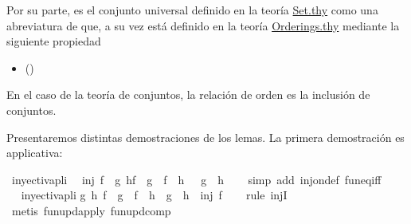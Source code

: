 \begin{isabellebody}
\begin{isamarkuptext}
\begin{itemize}
  \end{itemize} 
  Por su parte,  es el conjunto universal definido en la 
  teoría \href{http://bit.ly/2XtHCW6}{Set.thy} como una abreviatura de 
   que, a su vez está definido en la teoría 
  \href{http://bit.ly/2Xyj9Pe}{Orderings.thy} mediante la siguiente
  propiedad 
  \begin{itemize}
    \item[]  
      \hfill ()
  \end{itemize} 
  En el caso de la teoría de conjuntos, la relación de orden es la
  inclusión de conjuntos.

  Presentaremos distintas demostraciones de los lemas. La primera
  demostración es applicativa:%
\end{isamarkuptext}\isamarkuptrue%
\isamarkupfalse%
\ inyectivapli{\isacharcolon}\isanewline
\ \ {\isachardoublequoteopen}inj\ f\ {\isasymLongrightarrow}\ {\isacharparenleft}{\isasymforall}g\ h{\isachardot}{\isacharparenleft}f\ {\isasymcirc}\ g\ {\isacharequal}\ f\ {\isasymcirc}\ h{\isacharparenright}\ {\isasymlongrightarrow}\ \ {\isacharparenleft}g\ {\isacharequal}\ h{\isacharparenright}{\isacharparenright}{\isachardoublequoteclose}\isanewline
%
\isadelimproof
\ \ %
\endisadelimproof
%
\isatagproof
{}\isamarkupfalse%
\ {\isacharparenleft}simp\ add{\isacharcolon}\ inj{\isacharunderscore}on{\isacharunderscore}def\ fun{\isacharunderscore}eq{\isacharunderscore}iff{\isacharparenright}\ \isanewline
\ \ \isamarkupfalse%
%
\endisatagproof
{\isafoldproof}%
%
\isadelimproof
\ \isanewline
%
\endisadelimproof
\isanewline
{}\isamarkupfalse%
\ inyectivapli{}{\isacharcolon}\isanewline
{\isachardoublequoteopen}{\isasymforall}g\ h{\isachardot}\ {\isacharparenleft}f\ {\isasymcirc}\ g\ {\isacharequal}\ f\ {\isasymcirc}\ h\ {\isasymlongrightarrow}\ g\ {\isacharequal}\ h{\isacharparenright}\ {\isasymLongrightarrow}\ inj\ f{\isachardoublequoteclose}\isanewline
%
\isadelimproof
\ \ %
\endisadelimproof
%
\isatagproof
{}\isamarkupfalse%
\ {\isacharparenleft}rule\ injI{\isacharparenright}\isanewline
\ \ \isamarkupfalse%
\ {\isacharparenleft}metis\ fun{\isacharunderscore}upd{\isacharunderscore}apply\ fun{\isacharunderscore}upd{\isacharunderscore}comp{\isacharparenright}%
\endisatagproof
{\isafoldproof}%

\end{isabellebody}
